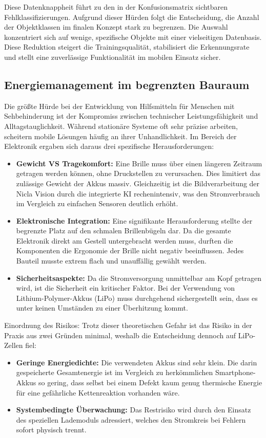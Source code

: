 \begin{itemize}
Diese Datenknappheit führt zu den in der Konfusionsmatrix sichtbaren Fehlklassifizierungen. Aufgrund dieser Hürden folgt die Entscheidung, die Anzahl der Objektklassen im finalen Konzept stark zu begrenzen. Die Auswahl konzentriert sich auf wenige, spezifische Objekte mit einer vielseitigen Datenbasis. Diese Reduktion steigert die Trainingsqualität, stabilisiert die Erkennungsrate und stellt eine zuverlässige Funktionalität im mobilen Einsatz sicher.
\end{itemize}

\subsection{Energiemanagement im begrenzten Bauraum}
Die größte Hürde bei der Entwicklung von Hilfsmitteln für Menschen mit Sehbehinderung ist der Kompromiss zwischen technischer Leistungsfähigkeit und Alltagstauglichkeit. Während stationäre Systeme oft sehr präzise arbeiten, scheitern mobile Lösungen häufig an ihrer Unhandlichkeit. Im Bereich der Elektronik ergaben sich daraus drei spezifische Herausforderungen:

\begin{itemize}
    \item \textbf{Gewicht VS Tragekomfort:} Eine Brille muss über einen längeren Zeitraum getragen werden können, ohne Druckstellen zu verursachen. Dies limitiert das zulässige Gewicht der Akkus massiv. Gleichzeitig ist die Bildverarbeitung der Nicla Vision durch die integrierte KI rechenintensiv, was den Stromverbrauch im Vergleich zu einfachen Sensoren deutlich erhöht.
    \item \textbf{Elektronische Integration:} Eine signifikante Herausforderung stellte der begrenzte Platz auf den schmalen Brillenbügeln dar. Da die gesamte Elektronik direkt am Gestell untergebracht werden muss, durften die Komponenten die Ergonomie der Brille nicht negativ beeinflussen. Jedes Bauteil musste extrem flach und unauffällig gewählt werden.
    \item \textbf{Sicherheitsaspekte:} Da die Stromversorgung unmittelbar am Kopf getragen wird, ist die Sicherheit ein kritischer Faktor. Bei der Verwendung von Lithium-Polymer-Akkus (LiPo) muss durchgehend sichergestellt sein, dass es unter keinen Umständen zu einer Überhitzung kommt. 
\end{itemize}

Einordnung des Risikos: Trotz dieser theoretischen Gefahr ist das Risiko in der Praxis aus zwei Gründen minimal, weshalb die Entscheidung dennoch auf LiPo-Zellen fiel:
\begin{itemize}
    \item \textbf{Geringe Energiedichte:} Die verwendeten Akkus sind sehr klein. Die darin gespeicherte Gesamtenergie ist im Vergleich zu herkömmlichen Smartphone-Akkus so gering, dass selbst bei einem Defekt kaum genug thermische Energie für eine gefährliche Kettenreaktion vorhanden wäre.
    \item \textbf{Systembedingte Überwachung:} Das Restrisiko wird durch den Einsatz des speziellen Lademoduls adressiert, welches den Stromkreis bei Fehlern sofort physisch trennt.
\end{itemize}

